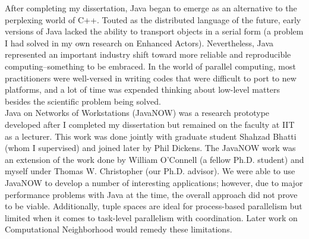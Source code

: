 \begin{refsection}
    \nocite{william_t._oconnell_distributed_1997}
    \nocite{william_t._oconnell_distributed_1994}
    \nocite{william_oconnell_generic_1994}
    \printbibliography[heading=none]
\end{refsection}


{
After completing my dissertation, Java began to emerge as an alternative to the perplexing world of C++. Touted as the distributed language of the future, early versions of Java lacked the ability to transport objects in a serial form (a problem I had solved in my own research on Enhanced Actors). Nevertheless, Java represented an important industry shift toward more reliable and reproducible computing--something to be embraced. In the world of parallel computing, most practitioners were well-versed in writing codes that were difficult to port to new platforms, and a lot of time was expended thinking about low-level matters besides the scientific problem being solved.
\vspace{5pt}
\\
Java on Networks of Workstations (JavaNOW) was a research prototype developed after I completed my dissertation but remained on the faculty at IIT as a lecturer. This work was done jointly with graduate student Shahzad Bhatti (whom I supervised) and joined later by Phil Dickens. The JavaNOW work was an extension of the work done by William O'Connell (a fellow Ph.D. student) and myself under Thomas W. Christopher (our Ph.D. advisor). We were able to use JavaNOW to develop a number of interesting applications; however, due to major performance problems with Java at the time, the overall approach did not prove to be viable. Additionally, tuple spaces are ideal for process-based parallelism but limited when it comes to task-level parallelism with coordination. Later work on Computational Neighborhood would remedy these limitations.}

\begin{refsection}
    \nocite{george_k._thiruvathukal_java_2000}
    \printbibliography[heading=none]
\end{refsection}


